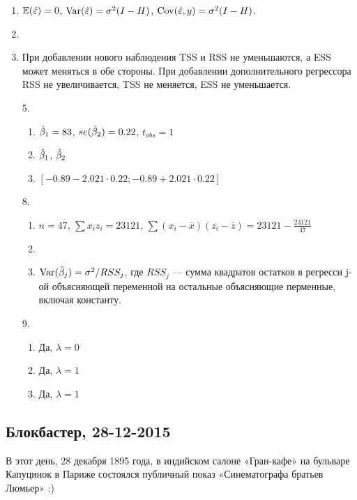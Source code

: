 \documentclass[12pt, a4paper]{article}
\begin{document}
\begin{enumerate}
\item $\mathbb{E}(\hat{\varepsilon}) = 0$, $\operatorname{Var}(\hat{\varepsilon}) = \sigma^2 (I - H)$, $\operatorname{Cov}(\hat{\varepsilon}, y) =  \sigma^2 (I - H)$.
\item
\item При добавлении нового наблюдения TSS и RSS не уменьшаются, а ESS может меняться в обе стороны.
При добавлении дополнительного регрессора RSS не увеличивается, TSS не меняется, ESS не уменьшается.
\item[5.]
\begin{enumerate}
\item $\hat{\beta}_1 = 83$, $se(\hat{\beta}_2) = 0.22$, $t_{obs} = 1$
\item $\hat{\beta}_1$, $\hat{\beta}_2$
\item $[-0.89  - 2.021 \cdot 0.22; -0.89 + 2.021 \cdot 0.22]$
\end{enumerate}
\item[8.]
\begin{enumerate}
\item $n=47$, $\sum x_iz_i = 23121$, $\sum(x_i-\bar{x})(z_i-\bar{z}) = 23121 - \frac{23121}{47}$
\item
\item $\operatorname{Var}(\hat{\beta}_j) = \sigma^2/RSS_j$, где $RSS_j$ — сумма квадратов остатков в регресси j-ой объясняющей переменной на остальные объясняющие перменные, включая константу.
\end{enumerate}
\item[9.]
\begin{enumerate}
\item Да, $\lambda=0$
\item Да, $\lambda=1$
\item Да, $\lambda=1$
\end{enumerate}
\end{enumerate}

\subsection{Блокбастер, 28-12-2015}

В этот день, 28 декабря 1895 года, в индийском салоне «Гран-кафе» на бульваре Капуцинок в Париже состоялся публичный показ «Синематографа братьев Люмьер» :)
\end{document}
